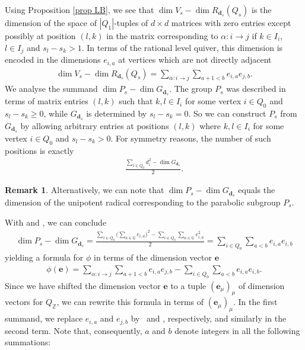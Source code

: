 \documentclass[10pt,a4paper]{amsart}
\numberwithin{equation}{section}
\theoremstyle{definition}
\newtheorem{Remark}[Theorem]{Remark}
\begin{document}
Using Proposition \ref{prop LB}, we see that $ \dim V_s - \dim R_{\mathbf{d}_s} (Q_s)$ is the dimension of the space of $|Q_1|$-tuples of $d\times d$ matrices with zero entries except possibly at position $(l,k)$ in the matrix corresponding to $\alpha\colon i\rightarrow j$ if $k\in I_i$, $l\in I_{j}$ and $s_l - s_k > 1$. In terms of the rational level quiver, this dimension is encoded in the dimensions $e_{i,a}$ at vertices which are not directly adjacent
\begin{align*}
\dim V_s - \dim R_{\mathbf{d}_s} (Q_s) = \sum_{\alpha\colon i \rightarrow j} \sum_{a+1<b} e_{i,a} e_{j,b} .
\end{align*}
We analyse the summand $\dim P_s - \dim G_{\mathbf{d}_s}$. The group $P_s$ was described in terms of matrix entries $(l,k)$ such that $k,l\in I_i$ for some vertex $i\in Q_0$ and $s_l - s_k \geq 0$, while $G_{\mathbf{d}_s}$ is determined by $s_l - s_k = 0$. So we can construct $P_s$ from $G_{\mathbf{d}_s}$ by allowing arbitrary entries at positions $(l,k)$ where $k,l\in I_i$ for some vertex $i\in Q_0$ and $s_l - s_k > 0$. For symmetry reasons, the number of such positions is exactly
\begin{align*}
\frac {\sum_{i\in Q_0} d_i^2 - \dim G_{\mathbf{d}_s}}{2} .
\end{align*}
\begin{Remark}
Alternatively, we can note that $\dim P_s - \dim G_{\mathbf{d}_s}$ equals the dimension of the unipotent radical corresponding to the parabolic subgroup $P_s$.
\end{Remark}
With  and , we can conclude
\begin{align*}
\dim P_s - \dim G_{\mathbf{d}_s} = \frac{\sum_{ i \in Q_0} \bigl(\sum_{a \in \mathbb{Q}} e_{i,a}\bigr)^2 - \sum_{ i \in Q_0} \sum_{a \in \mathbb{Q}} e_{i,a}^2 } {2} = \sum_{i \in Q_0} \sum_{a < b} e_{i,a} e_{i,b}
\end{align*}
yielding a formula for $\phi$ in terms of the dimension vector $\mathbf{e}$
\begin{align*}
\phi(\mathbf{e}) = \sum_{\alpha\colon i \rightarrow j} \sum_{a+1 <b} e_{i,a} e_{j,b} - \sum_{ i \in Q_0} \sum_{a < b} e_{i,a} e_{i,b} .
\end{align*}
Since we have shifted the dimension vector $\mathbf{e}$ to a tuple $(\mathbf{e}_{\mu})_\mu$ of dimension vectors for $Q_\mathbb{Z}$, we can rewrite this formula in terms of $(\mathbf{e}_{\mu})_{\mu}$. In the first summand, we replace $e_{i,a}$ and $e_{j,b}$ by~ and , respectively, and similarly in the second term. Note that, consequently, $a$ and $b$ denote integers in all the following summations:
\end{document}
